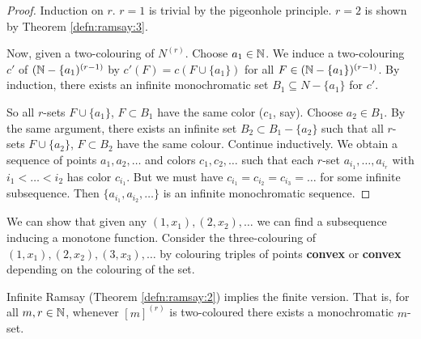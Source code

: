 \begin{proof}
  Induction on $r$.  $r = 1$ is trivial by the pigeonhole principle.
  $r = 2$ is shown by Theorem \ref{defn:ramsay:3}.

  Now, given a two-colouring of $N^{(r)}$.  Choose $a_{1} \in \mathbb{N}$.  We
  induce a two-colouring $c'$ of $(\mathbb{N} - \{ a_{1} )^{(r-1)}$ by $c'(F)
  = c(F \cup \{ a_{1} \})$  for all $F \in (\mathbb{N} - \{ a_{1} \})^{(r -
    1)}$.  By induction, there exists an infinite monochromatic set
  $B_{1} \subseteq N - \{ a_{1} \}$ for $c'$.

  So all $r$-sets $F \cup \{ a_{1} \}$, $F \subset B_{1}$ have the
  same color ($c_{1}$, say).  Choose $a_{2} \in B_{1}$.  By the same
  argument, there exists an infinite set $B_{2} \subset B_{1} - \{
  a_{2} \}$ such that all $r$-sets $F \cup \{ a_{2} \}$, $F \subset
  B_{2}$ have the same colour.  Continue inductively.  We obtain a
  sequence of points $a_{1}, a_{2}, \dots$ and colors $c_{1}, c_{2},
  \dots$ such that each $r$-set $a_{i_{1}}, \dots, a_{i_{r}}$ with
  $i_{1} < \dots < i_{2}$ has color $c_{i_{1}}$.  But we must have
  $c_{i_{1}} = c_{i_{2}} = c_{i_{3}} = \dots$ for some infinite
  subsequence.  Then $\{ a_{i_{1}}, a_{i_{2}}, \dots \}$ is an
  infinite monochromatic sequence.
\end{proof}

\begin{exmp}
  \label{defn:ramsay:4}
  We can show that given any $(1, x_{1}), (2, x_{2}), \dots$ we can
  find a subsequence inducing a monotone function.  Consider the
 three-colouring of $(1, x_{1}), (2, x_{2}), (3, x_{3}),
  \dots$ by colouring triples of points \textbf{convex} or
  \textbf{convex} depending on the colouring of the set.
\end{exmp}

\begin{thm}
  \label{defn:ramsay:5}
  Infinite Ramsay (Theorem \ref{defn:ramsay:2}) implies the finite
  version.  That is, for all $m, r \in \mathbb{N}$, whenever $[m]^{(r)}$ is
  two-coloured there exists a monochromatic $m$-set.
\end{thm}

